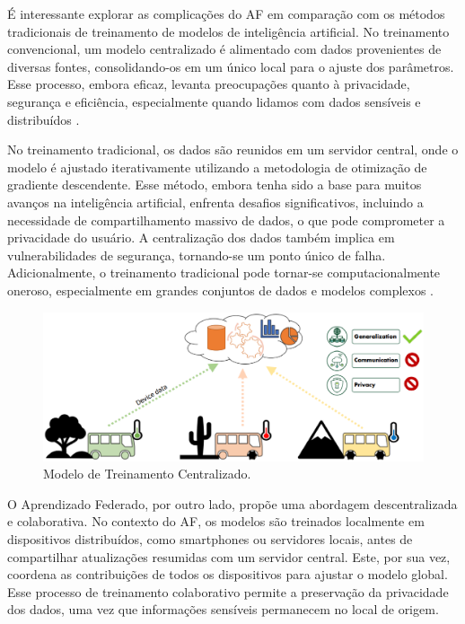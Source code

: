 É interessante explorar as complicações do AF em comparação com os métodos tradicionais de treinamento de modelos de inteligência artificial. No treinamento convencional, um modelo centralizado é alimentado com dados provenientes de diversas fontes, consolidando-os em um único local para o ajuste dos parâmetros. Esse processo, embora eficaz, levanta preocupações quanto à privacidade, segurança e eficiência, especialmente quando lidamos com dados sensíveis e distribuídos \cite{goodfellow2016deep}.

No treinamento tradicional, os dados são reunidos em um servidor central, onde o modelo é ajustado iterativamente utilizando a metodologia de otimização de gradiente descendente. Esse método, embora tenha sido a base para muitos avanços na inteligência artificial, enfrenta desafios significativos, incluindo a necessidade de compartilhamento massivo de dados, o que pode comprometer a privacidade do usuário. A centralização dos dados também implica em vulnerabilidades de segurança, tornando-se um ponto único de falha. Adicionalmente, o treinamento tradicional pode tornar-se computacionalmente oneroso, especialmente em grandes conjuntos de dados e modelos complexos \cite{sutskever2013importance}.

\begin{figure}[ht]
    \centering
    \includegraphics[scale=0.50]{figuras/TraditionalCentralizedLearning.eps}
    \caption{Modelo de Treinamento Centralizado.}
    \label{fig:TraditionalCentralizedLearning}
\end{figure}

O Aprendizado Federado, por outro lado, propõe uma abordagem descentralizada e colaborativa. No contexto do AF, os modelos são treinados localmente em dispositivos distribuídos, como smartphones ou servidores locais, antes de compartilhar atualizações resumidas com um servidor central. Este, por sua vez, coordena as contribuições de todos os dispositivos para ajustar o modelo global. Esse processo de treinamento colaborativo permite a preservação da privacidade dos dados, uma vez que informações sensíveis permanecem no local de origem\cite{mcmahan2017communication}.

